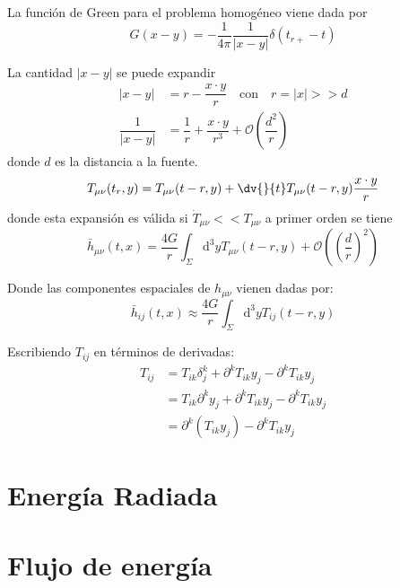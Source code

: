 \documentclass[../main]{subfiles}
\begin{document}
\begin{adjustwidth}{0pt}{-100pt}
La función de Green para el problema homogéneo viene dada por 
\begin{equation}
    G(x-y)=-\dfrac{1}{4\pi} \dfrac{1}{|x-y|}\delta(t_{r+}-t)
\end{equation}

La cantidad $|x-y|$ se puede expandir 
\begin{equation}
    \begin{split}
        |x-y|&=r-\dfrac{x\cdot y}{r} \quad \text{con} \quad r=|x| >> d \\
        \dfrac{1}{|x-y|}&=\dfrac{1}{r}+\dfrac{x\cdot y}{r^3}+\mathcal{O}\left(\dfrac{d^2}{r}\right)
    \end{split}
\end{equation}
donde $d$ es la distancia a la fuente.
\begin{equation}
    T_{\mu\nu}(t_r, y)=T_{\mu\nu}(t-r, y)+\dv{}{t}T_{\mu\nu}(t-r, y)\dfrac{x\cdot y}{r}
\end{equation}
donde esta expansión es válida si $\dot{T}_{\mu\nu} << T_{\mu\nu}$ a primer orden se tiene 
\begin{equation}
    \bar{h}_{\mu\nu}(t, x)=\dfrac{4G}{r}\int_{\Sigma} \mathrm{d^3}y T_{\mu\nu}(t-r, y)+\mathcal{O}\left(\left(\dfrac{d}{r}\right)^2\right)
\end{equation}

Donde las componentes espaciales de $h_{\mu\nu}$ vienen dadas por:
\begin{equation}
    \bar{h}_{ij}(t, x)\approx \dfrac{4G}{r}\int_{\Sigma}\mathrm{d}^3 y T_{ij}(t-r, y)
\end{equation}

Escribiendo $T_{ij}$ en términos de derivadas:
\begin{equation}
    \begin{split}
        T_{ij}&=T_{ik}\delta^k_j+\partial^k T_{ik}y_j-\partial^k T_{ik}y_j \\
        &=T_{ik}\partial^k y_j+\partial^k T_{ik}y_j-\partial^k T_{ik}y_j \\
        &=\partial^k(T_{ik}y_j)-\partial^k T_{ik} y_j
    \end{split}
\end{equation}


\section{Energía Radiada}\label{part8.4}

\section{Flujo de energía}\label{part8.5}


\end{adjustwidth}
\end{document}
